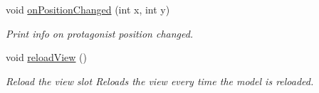 \begin{DoxyCompactItemize}
void \hyperlink{classWorldTerminalView_acce60911ae9ec49a2d25c9df3d0a4aa7}{on\+Position\+Changed} (int x, int y)
\begin{DoxyCompactList}\small\item\em Print info on protagonist position changed. \end{DoxyCompactList}\item 
void \hyperlink{classWorldTerminalView_ac2a90b7f75ef680dfc3acb5ee56e022a}{reload\+View} ()\hypertarget{classWorldTerminalView_ac2a90b7f75ef680dfc3acb5ee56e022a}{}\label{classWorldTerminalView_ac2a90b7f75ef680dfc3acb5ee56e022a}

\begin{DoxyCompactList}\small\item\em Reload the view slot Reloads the view every time the model is reloaded. \end{DoxyCompactList}\end{DoxyCompactItemize}
